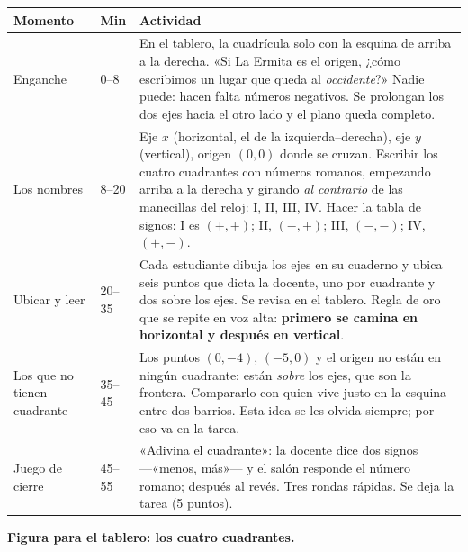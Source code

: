 \documentclass[11pt]{article}
\begin{document}
\begin{center}
{\renewcommand{\arraystretch}{1.3}
\begin{tabularx}{\linewidth}{@{}l l X@{}}
  \toprule
  \textbf{Momento} & \textbf{Min} & \textbf{Actividad}\\
  \midrule
  Enganche & 0--8 & En el tablero, la cuadrícula solo con la esquina de arriba a la derecha.
    «Si La Ermita es el origen, ¿cómo escribimos un lugar que queda al \emph{occidente}?»
    Nadie puede: hacen falta números negativos. Se prolongan los dos ejes hacia el otro lado y
    el plano queda completo.\\
  Los nombres & 8--20 & Eje $x$ (horizontal, el de la izquierda–derecha), eje $y$ (vertical),
    origen $(0,0)$ donde se cruzan. Escribir los cuatro cuadrantes con números romanos,
    empezando arriba a la derecha y girando \emph{al contrario} de las manecillas del reloj:
    I, II, III, IV. Hacer la tabla de signos: I es $(+,+)$; II, $(-,+)$; III, $(-,-)$; IV,
    $(+,-)$.\\
  Ubicar y leer & 20--35 & Cada estudiante dibuja los ejes en su cuaderno y ubica seis puntos
    que dicta la docente, uno por cuadrante y dos sobre los ejes. Se revisa en el tablero.
    Regla de oro que se repite en voz alta: \textbf{primero se camina en horizontal y después
    en vertical}.\\
  Los que no tienen cuadrante & 35--45 & Los puntos $(0,-4)$, $(-5,0)$ y el origen no están en
    ningún cuadrante: están \emph{sobre} los ejes, que son la frontera. Compararlo con quien
    vive justo en la esquina entre dos barrios. Esta idea se les olvida siempre; por eso va en
    la tarea.\\
  Juego de cierre & 45--55 & «Adivina el cuadrante»: la docente dice dos signos —«menos, más»—
    y el salón responde el número romano; después al revés. Tres rondas rápidas. Se deja la
    tarea (5 puntos).\\
  \bottomrule
\end{tabularx}}
\end{center}

\textbf{Figura para el tablero: los cuatro cuadrantes.}

\begin{center}
\end{center}
\end{document}
